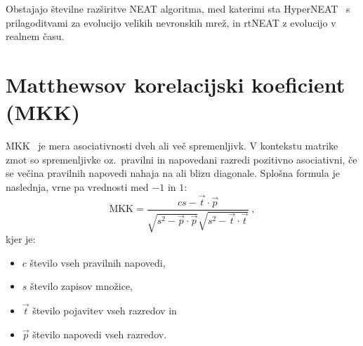 \documentclass[a4paper,12pt,openright]{book}
\begin{document}
    Obstajajo številne razširitve NEAT algoritma, med katerimi sta HyperNEAT~\cite{Iba_2018} s prilagoditvami za evolucijo velikih nevronskih mrež,
    in rtNEAT z evolucijo v realnem času.


    \section{Matthewsov korelacijski koeficient (MKK)}\label{sec:mkk}
    MKK~\cite{mcc_wiki} je mera asociativnosti dveh ali več spremenljivk.
    V kontekstu matrike zmot so spremenljivke oz.\ pravilni in napovedani razredi pozitivno asociativni, če se večina pravilnih napovedi nahaja na ali blizu diagonale.
    Splošna formula je naslednja, vrne pa vrednosti med $-1$ in $1$:
    \begin{equation}
        \text{MKK}={\frac {cs-{\vec {t}}\cdot {\vec {p}}}{{\sqrt {s^{2}-{\vec {p}}\cdot {\vec {p}}}}{\sqrt {s^{2}-{\vec {t}}\cdot {\vec {t}}}}}}\:,
        \label{eq:mcc}
    \end{equation}
    kjer je:
    \begin{itemize}
        \item $c$ število vseh pravilnih napovedi,
        \item $s$ število zapisov množice,
        \item $\vec{t}$ število pojavitev vseh razredov in
        \item $\vec{p}$ število napovedi vseh razredov.
    \end{itemize}

\end{document}
